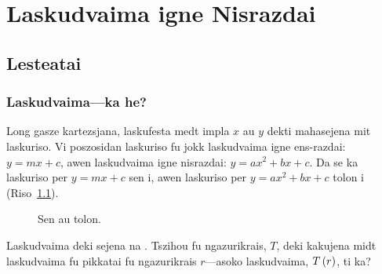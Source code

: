 \chapter{Laskudvaima igne Nisrazdai}

\section{Lesteatai}

\subsection{Laskudvaima---ka he?}

Long gasze kartezsjana, laskufesta medt impla \(x\) au \(y\) dekti mahasejena mit laskuriso.
Vi poszosidan laskuriso fu jokk laskudvaima igne ens-razdai: \(y = mx + c\), awen laskudvaima igne
nisrazdai: \(y = ax^2 + bx + c\). Da se ka laskuriso per \(y = mx + c\) sen i, awen laskuriso per
\(y = ax^2 + bx + c\) tolon i (Riso~\ref{fig:sen-au-tolon}).

\begin{figure}[htpb]
	\centering
	\hfill
	\hfill
	\hfill
	\caption{Sen au tolon.}
	\label{fig:sen-au-tolon}
\end{figure}

\begin{remark}
	Laskudvaima deki sejena na . Tszihou fu
	ngazurikrais, \(T\), deki kakujena midt laskudvaima fu pikkatai
	fu ngazurikrais \(r\)---asoko laskudvaima, \(T\left(r\right)\), ti ka?
\end{remark}

